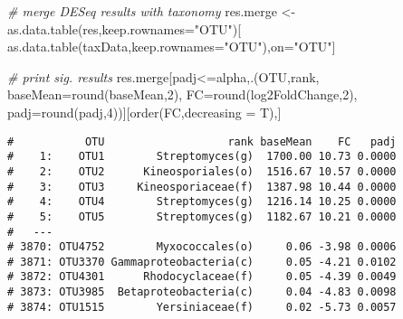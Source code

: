 \documentclass[
]{article}
\newenvironment{Shaded}{\begin{snugshade}}{\end{snugshade}}
\newcommand{\AttributeTok}[1]{\textcolor[rgb]{0.77,0.63,0.00}{#1}}
\newcommand{\CommentTok}[1]{\textcolor[rgb]{0.56,0.35,0.01}{\textit{#1}}}
\newcommand{\DecValTok}[1]{\textcolor[rgb]{0.00,0.00,0.81}{#1}}
\newcommand{\FunctionTok}[1]{\textcolor[rgb]{0.00,0.00,0.00}{#1}}
\newcommand{\NormalTok}[1]{#1}
\newcommand{\OtherTok}[1]{\textcolor[rgb]{0.56,0.35,0.01}{#1}}
\newcommand{\SpecialCharTok}[1]{\textcolor[rgb]{0.00,0.00,0.00}{#1}}
\newcommand{\StringTok}[1]{\textcolor[rgb]{0.31,0.60,0.02}{#1}}
\begin{document}
\begin{Shaded}
\begin{Highlighting}[]
\CommentTok{\# merge DESeq results with taxonomy}
\NormalTok{res.merge }\OtherTok{\textless{}{-}} \FunctionTok{as.data.table}\NormalTok{(res,}\AttributeTok{keep.rownames=}\StringTok{"OTU"}\NormalTok{)[}
  \FunctionTok{as.data.table}\NormalTok{(taxData,}\AttributeTok{keep.rownames=}\StringTok{"OTU"}\NormalTok{),on}\OtherTok{=}\StringTok{"OTU"}\NormalTok{]}

\CommentTok{\# print sig. results}
\NormalTok{res.merge[padj}\SpecialCharTok{\textless{}=}\NormalTok{alpha,.(OTU,rank,}
                        \AttributeTok{baseMean=}\FunctionTok{round}\NormalTok{(baseMean,}\DecValTok{2}\NormalTok{),}
                        \AttributeTok{FC=}\FunctionTok{round}\NormalTok{(log2FoldChange,}\DecValTok{2}\NormalTok{),}
                        \AttributeTok{padj=}\FunctionTok{round}\NormalTok{(padj,}\DecValTok{4}\NormalTok{))][}\FunctionTok{order}\NormalTok{(FC,}\AttributeTok{decreasing =}\NormalTok{ T),]}
\end{Highlighting}
\end{Shaded}

\begin{verbatim}
#           OTU                   rank baseMean    FC   padj
#    1:    OTU1        Streptomyces(g)  1700.00 10.73 0.0000
#    2:    OTU2      Kineosporiales(o)  1516.67 10.57 0.0000
#    3:    OTU3     Kineosporiaceae(f)  1387.98 10.44 0.0000
#    4:    OTU4        Streptomyces(g)  1216.14 10.25 0.0000
#    5:    OTU5        Streptomyces(g)  1182.67 10.21 0.0000
#   ---                                                     
# 3870: OTU4752        Myxococcales(o)     0.06 -3.98 0.0006
# 3871: OTU3370 Gammaproteobacteria(c)     0.05 -4.21 0.0102
# 3872: OTU4301      Rhodocyclaceae(f)     0.05 -4.39 0.0049
# 3873: OTU3985  Betaproteobacteria(c)     0.04 -4.83 0.0098
# 3874: OTU1515        Yersiniaceae(f)     0.02 -5.73 0.0057
\end{verbatim}
\end{document}
